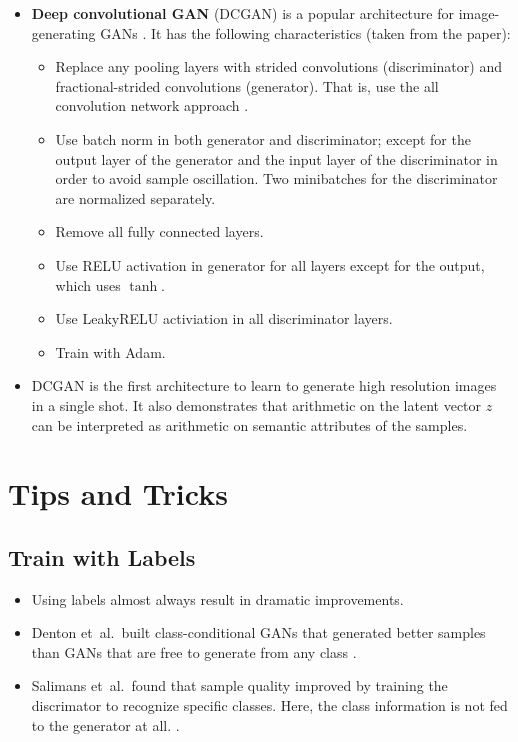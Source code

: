 \documentclass[10pt]{article}
\newcommand{\etal}{{et~al.}}
\begin{document}
  \begin{itemize}
    \item \textbf{Deep convolutional GAN} (DCGAN) is a popular architecture for image-generating GANs \cite{Radford:2015}. It has the following characteristics (taken from the paper):
    \begin{itemize}
      \item Replace any pooling layers with strided convolutions (discriminator) and fractional-strided convolutions (generator). That is, use the all convolution network approach \cite{Springenberg:2014}.

      \item Use batch norm in both generator and discriminator; except for the output layer of the generator and the input layer of the discriminator in order to avoid sample oscillation. Two minibatches for the discriminator are normalized separately.

      \item Remove all fully connected layers.

      \item Use RELU activation in generator for all layers except for the output, which uses $\tanh$.

      \item Use LeakyRELU activiation in all discriminator layers.

      \item Train with Adam.
    \end{itemize}

    \item DCGAN is the first architecture to learn to generate high resolution images in a single shot. It also demonstrates that arithmetic on the latent vector $z$ can be interpreted as arithmetic on semantic attributes of the samples.
  \end{itemize}

  \section{Tips and Tricks}

  \subsection{Train with Labels}

  \begin{itemize}
    \item Using labels almost always result in dramatic improvements.

    \item Denton \etal\ built class-conditional GANs that generated better samples than GANs that are free to generate from any class \cite{Denton:2015}.

    \item Salimans \etal\ found that sample quality improved by training the discrimator to recognize specific classes. Here, the class information is not fed to the generator at all. \cite{Salimans:2016}.
  \end{itemize}
\end{document}
